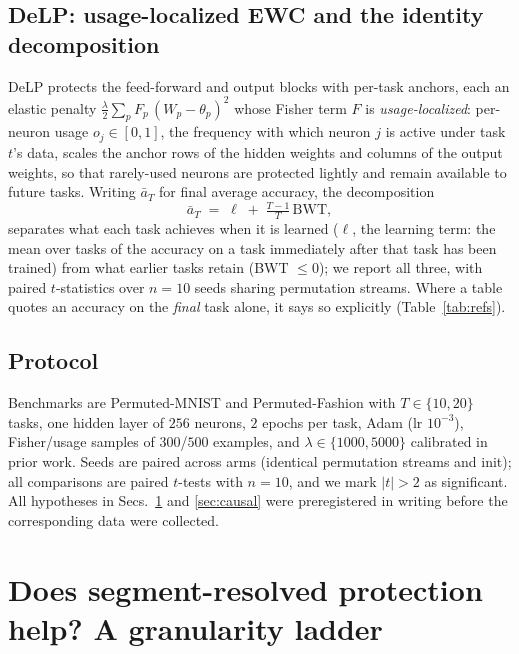 \documentclass[review,12pt,number]{elsarticle}
\newcommand{\delp}{DeLP}
\begin{document}
\subsection{\delp{}: usage-localized EWC and the identity decomposition}
\label{sec:delp}

\delp{} \cite{zhou2026delp} protects the feed-forward and output blocks with
per-task anchors, each an elastic penalty
$\frac{\lambda}{2}\sum_p F_p\, (W_p - \theta_p)^2$ whose Fisher term $F$ is
\emph{usage-localized}: per-neuron usage $o_j \in [0,1]$, the frequency with
which neuron $j$ is active under task $t$'s data, scales the anchor rows of
the hidden weights and columns of the output weights, so that rarely-used
neurons are protected lightly and remain available to future tasks. Writing
$\bar a_T$ for final average accuracy, the decomposition
\begin{equation}
\bar a_T \;=\; \ell \;+\; \tfrac{T-1}{T}\,\mathrm{BWT},
\label{eq:identity}
\end{equation}
separates what each task achieves when it is learned ($\ell$, the learning
term: the mean over tasks of the accuracy on a task immediately after that
task has been trained) from what earlier tasks retain (BWT $\le 0$); we
report all three, with paired $t$-statistics over $n{=}10$ seeds sharing
permutation streams. Where a table quotes an accuracy on the \emph{final}
task alone, it says so explicitly (Table~\ref{tab:refs}).

\subsection{Protocol}
\label{sec:protocol}

Benchmarks are Permuted-MNIST and Permuted-Fashion \cite{parisi2019,xiao2017} with
$T\in\{10,20\}$ tasks, one hidden layer of $256$ neurons, $2$ epochs per
task, Adam (lr $10^{-3}$), Fisher/usage samples of $300$/$500$ examples, and
$\lambda \in \{1000, 5000\}$ calibrated in prior work. Seeds are paired
across arms (identical permutation streams and init); all comparisons are
paired $t$-tests with $n{=}10$, and we mark $|t|>2$ as significant. All
hypotheses in Secs.~\ref{sec:granularity} and \ref{sec:causal} were
preregistered in writing before the corresponding data were collected.

\section{Does segment-resolved protection help? A granularity ladder}
\label{sec:granularity}
\end{document}

